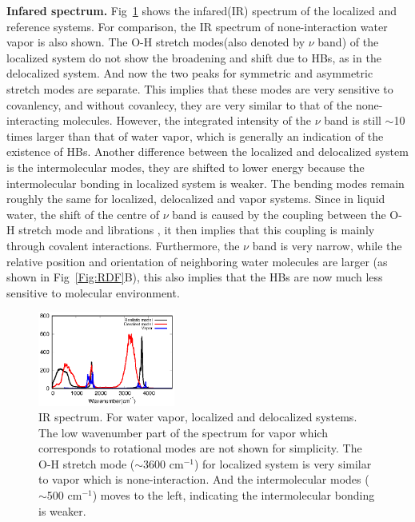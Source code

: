 \documentclass[prl,twocolumn,showpacs]{revtex4}
\begin{document}
\textbf{Infared spectrum.} Fig~\ref{Fig:IR} shows the infared(IR) spectrum of the localized and reference systems. For comparison, the IR spectrum of none-interaction water vapor is also shown. The O-H stretch modes(also denoted by $\nu$ band) of the localized system do not show the broadening and shift due to HBs, as in the delocalized system. And now the two peaks for symmetric and asymmetric stretch modes are separate. This implies that these modes are very sensitive to covanlency, and without covanlecy, they are very similar to that of the none-interacting molecules. \new However, the integrated intensity of the $\nu$ band is still $\sim$10 times larger than that of water vapor, which is generally an indication of the existence of HBs. \old Another difference between the localized and delocalized system is the intermolecular modes, they are shifted to lower energy because the intermolecular bonding in localized system is weaker. The bending modes remain roughly the same for localized, delocalized and vapor systems. Since in liquid water, the shift of the centre of $\nu$ band is caused by the coupling between the O-H stretch mode and librations \cite{marechal2006hydrogen}, it then implies that this coupling is mainly through covalent interactions. Furthermore, the $\nu$ band is very narrow, while the relative position and orientation of neighboring water molecules are larger (as shown in Fig~\ref{Fig:RDF}B), this also implies that the HBs are now much less sensitive to molecular environment.

\begin{figure}
\includegraphics[width=0.4\textwidth]{new_ir}
\caption{IR spectrum. For water vapor, localized and delocalized systems. The low wavenumber part of the spectrum for vapor which corresponds to rotational modes are not shown for simplicity.  The O-H stretch mode ($\sim$3600 cm$^{-1}$) for localized system is very similar to vapor which is none-interaction. And the intermolecular modes ($\sim$500 cm$^{-1}$) moves to the left, indicating the intermolecular bonding is weaker. } \label{Fig:IR}
\end{figure}
\end{document}
